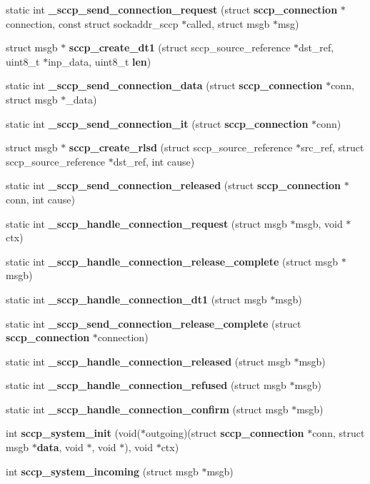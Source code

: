\begin{DoxyCompactItemize}
\item 
static int {\bf \+\_\+sccp\+\_\+send\+\_\+connection\+\_\+request} (struct {\bf sccp\+\_\+connection} $\ast$connection, const struct sockaddr\+\_\+sccp $\ast$called, struct msgb $\ast$msg)
\item 
struct msgb $\ast$ {\bf sccp\+\_\+create\+\_\+dt1} (struct sccp\+\_\+source\+\_\+reference $\ast$dst\+\_\+ref, uint8\+\_\+t $\ast$inp\+\_\+data, uint8\+\_\+t {\bf len})
\item 
static int {\bf \+\_\+sccp\+\_\+send\+\_\+connection\+\_\+data} (struct {\bf sccp\+\_\+connection} $\ast$conn, struct msgb $\ast$\+\_\+data)
\item 
static int {\bf \+\_\+sccp\+\_\+send\+\_\+connection\+\_\+it} (struct {\bf sccp\+\_\+connection} $\ast$conn)
\item 
struct msgb $\ast$ {\bf sccp\+\_\+create\+\_\+rlsd} (struct sccp\+\_\+source\+\_\+reference $\ast$src\+\_\+ref, struct sccp\+\_\+source\+\_\+reference $\ast$dst\+\_\+ref, int cause)
\item 
static int {\bf \+\_\+sccp\+\_\+send\+\_\+connection\+\_\+released} (struct {\bf sccp\+\_\+connection} $\ast$conn, int cause)
\item 
static int {\bf \+\_\+sccp\+\_\+handle\+\_\+connection\+\_\+request} (struct msgb $\ast$msgb, void $\ast$ctx)
\item 
static int {\bf \+\_\+sccp\+\_\+handle\+\_\+connection\+\_\+release\+\_\+complete} (struct msgb $\ast$msgb)
\item 
static int {\bf \+\_\+sccp\+\_\+handle\+\_\+connection\+\_\+dt1} (struct msgb $\ast$msgb)
\item 
static int {\bf \+\_\+sccp\+\_\+send\+\_\+connection\+\_\+release\+\_\+complete} (struct {\bf sccp\+\_\+connection} $\ast$connection)
\item 
static int {\bf \+\_\+sccp\+\_\+handle\+\_\+connection\+\_\+released} (struct msgb $\ast$msgb)
\item 
static int {\bf \+\_\+sccp\+\_\+handle\+\_\+connection\+\_\+refused} (struct msgb $\ast$msgb)
\item 
static int {\bf \+\_\+sccp\+\_\+handle\+\_\+connection\+\_\+confirm} (struct msgb $\ast$msgb)
\item 
int {\bf sccp\+\_\+system\+\_\+init} (void($\ast$outgoing)(struct {\bf sccp\+\_\+connection} $\ast$conn, struct msgb $\ast${\bf data}, void $\ast$, void $\ast$), void $\ast$ctx)
\item 
int {\bf sccp\+\_\+system\+\_\+incoming} (struct msgb $\ast$msgb)
\item 

\end{DoxyCompactItemize}
